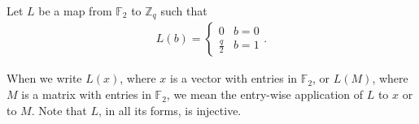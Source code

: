 \documentclass{article}
\begin{document}
Let $L$ be a map from $\mathbb{F}_2$ to $\mathbb{Z}_q$ such that
\begin{align}
	L(b) =
	\begin{cases}
		0 & b = 0 \\
		\frac{q}{2} & b = 1
	\end{cases}.
\end{align}

When we write $L(x)$, where $x$ is a vector with entries in $\mathbb{F}_2$, or $L(M)$, where $M$ is a matrix with entries in $\mathbb{F}_2$, we mean the entry-wise application of $L$ to $x$ or to $M$. Note that $L$, in all its forms, is injective.
\end{document}
